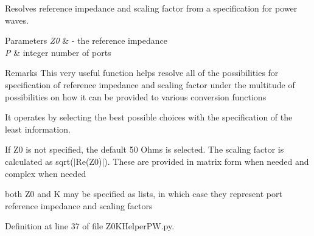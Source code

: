 Resolves reference impedance and scaling factor from a specification for power waves. 


\begin{DoxyParams}{Parameters}
{\em Z0} & -\/ the reference impedance \\
\hline
{\em P} & integer number of ports \\
\hline
\end{DoxyParams}
\begin{DoxyRemark}{Remarks}
This very useful function helps resolve all of the possibilities for specification of reference impedance and scaling factor under the multitude of possibilities on how it can be provided to various conversion functions
\end{DoxyRemark}
It operates by selecting the best possible choices with the specification of the least information.

If Z0 is not specified, the default 50 Ohms is selected. The scaling factor is calculated as sqrt($\vert$\+Re(Z0)$\vert$). These are provided in matrix form when needed and complex when needed

both Z0 and K may be specified as lists, in which case they represent port reference impedance and scaling factors 

Definition at line 37 of file Z0\+K\+Helper\+P\+W.\+py.

